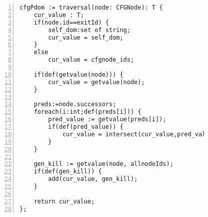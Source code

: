 \begin{figure}
\begin{lstlisting}[numbers=left, tabsize=4, escapechar=@, caption={Example traversal construct that computes post dominator.},label={lst:traversalWithfixp}] 
cfgPdom := traversal(node: CFGNode): T {
	cur_value : T;
	if(node.id==exitId) {
		self_dom:set of string;
		cur_value = self_dom;
	}
	else
		cur_value = cfgnode_ids;
	
	if(def(getvalue(node))) {
		cur_value = getvalue(node);
	}
	
	preds:=node.successors;
	foreach(i:int;def(preds[i])) {
		pred_value := getvalue(preds[i]);
		if(def(pred_value)) {
			cur_value = intersect(cur_value,pred_value);
		}
	}
	
	gen_kill := getvalue(node, allnodeIds);
	if(def(gen_kill)) {
		add(cur_value, gen_kill);
	}
		
	return cur_value;
};
\end{lstlisting}
\end{figure}


